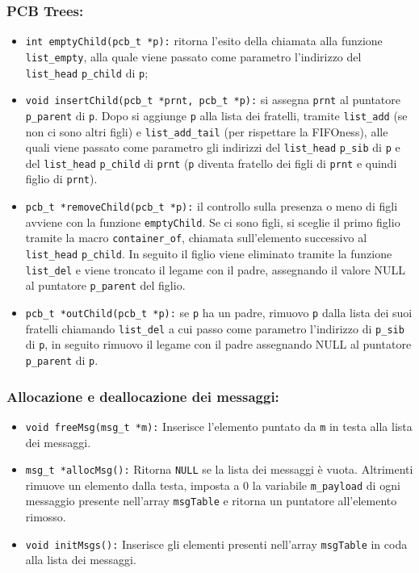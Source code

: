 \documentclass{article}
\begin{document}
	\subsubsection{PCB Trees:}
	\begin{itemize}
		\item \texttt{int emptyChild(pcb\_t *p):} ritorna l'esito della chiamata
			alla funzione \texttt{list\_empty}, alla quale viene passato come
			parametro l'indirizzo del \texttt{list\_head} \texttt{p\_child} di \texttt{p};

		\item \texttt{void insertChild(pcb\_t *prnt, pcb\_t *p):} si assegna \texttt{prnt}
			al puntatore \texttt{p\_parent} di \texttt{p}. Dopo si aggiunge \texttt{p}
			alla lista dei fratelli, tramite \texttt{list\_add} (se non ci sono altri
			figli) e \texttt{list\_add\_tail} (per rispettare la FIFOness), alle quali
			viene passato come parametro gli indirizzi del \texttt{list\_head} \texttt{p\_sib}
			di \texttt{p} e del \texttt{list\_head} \texttt{p\_child} di \texttt{prnt}
			(\texttt{p} diventa fratello dei figli di \texttt{prnt} e quindi figlio di
			\texttt{prnt}).

		\item \texttt{pcb\_t *removeChild(pcb\_t *p):} il controllo sulla presenza o
			meno di figli avviene con la funzione \texttt{emptyChild}. Se ci sono
			figli, si sceglie il primo figlio tramite la macro \texttt{container\_of},
			chiamata sull'elemento successivo al \texttt{list\_head} \texttt{p\_child}.
			In seguito il figlio viene eliminato tramite la funzione \texttt{list\_del}
			e viene troncato il legame con il padre, assegnando il valore NULL al
			puntatore \texttt{p\_parent} del figlio.

		\item \texttt{pcb\_t *outChild(pcb\_t *p):} se \texttt{p} ha un padre,
			rimuovo \texttt{p} dalla lista dei suoi fratelli chiamando \texttt{list\_del}
			a cui passo come parametro l'indirizzo di \texttt{p\_sib} di \texttt{p}, in
			seguito rimuovo il legame con il padre assegnando NULL al puntatore \texttt{p\_parent}
			di \texttt{p}.
	\end{itemize}

	\subsubsection{Allocazione e deallocazione dei messaggi:}
	\begin{itemize}
		\item \texttt{void freeMsg(msg\_t *m):} Inserisce l’elemento puntato da
			\texttt{m} in testa alla lista dei messaggi.

		\item \texttt{msg\_t *allocMsg():} Ritorna \texttt{NULL} se la lista dei messaggi
			è vuota. Altrimenti rimuove un elemento dalla testa, imposta a 0 la variabile
			\texttt{m\_payload} di ogni messaggio presente nell’array \texttt{msgTable}
			e ritorna un puntatore all’elemento rimosso.

		\item \texttt{void initMsgs():} Inserisce gli elementi presenti nell’array
			\texttt{msgTable} in coda alla lista dei messaggi.
	\end{itemize}
\end{document}
